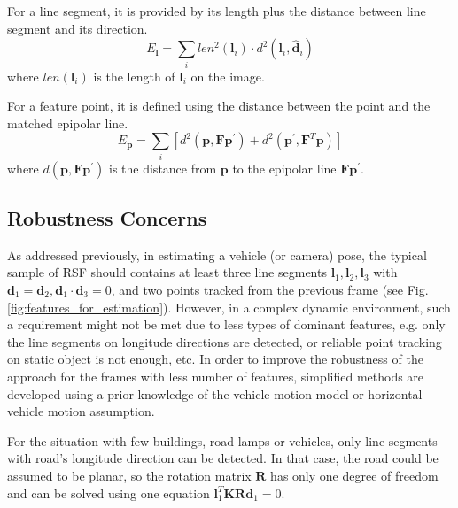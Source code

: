 \documentclass[letterpaper, 10 pt, conference]{ieeeconf}  %
\begin{document}
For a line segment, it is provided by its length plus the distance between line segment and its direction.
\begin{equation}
E_\mathbf{l} = \sum_{i} len^2(\mathbf{l}_i) \cdot d^2(\mathbf{l}_i,\hat{\mathbf{d}}_i)
\end{equation}
where $len(\mathbf{l}_i)$ is the length of $\mathbf{l}_i$ on the image.

For a feature point, it is defined using the distance between the point and the matched epipolar line.
\begin{equation}
E_\mathbf{p} = \sum_{i} \left[ d^2 (\mathbf{p}, \mathbf{F} \mathbf{p}^\prime)
+ d^2 (\mathbf{p}^\prime, \mathbf{F}^T\mathbf{p})\right]
\end{equation}
where $d (\mathbf{p}, \mathbf{F} \mathbf{p}^\prime)$ is the distance from $\mathbf{p}$ to the epipolar line $\mathbf{F} \mathbf{p}^\prime$.

\subsection{Robustness Concerns}
As addressed previously, in estimating a vehicle (or camera) pose, the typical sample of RSF should contains at least three line segments $\mathbf{l}_1,\mathbf{l}_2,\mathbf{l}_3$ with $\mathbf{d}_1=\mathbf{d}_2,\mathbf{d}_1\cdot \mathbf{d}_3=0$, and two points tracked from the previous frame (see Fig. \ref{fig:features_for_estimation}).
However, in a complex dynamic environment, such a requirement might not be met due to less types of dominant features, e.g. only the line segments on longitude directions are detected, or reliable point tracking on static object is not enough, etc. In order to improve the robustness of the approach for the frames with less number of features, simplified methods are developed using a prior knowledge of the vehicle motion model or horizontal vehicle motion assumption.

For the situation with few buildings, road lamps or vehicles, only line segments with road's longitude direction can be detected. In that case, the road could be assumed to be planar, so the rotation matrix $\mathbf{R}$ has only one degree of freedom and can be solved using one equation $\mathbf{l}_1^T\mathbf{K}\mathbf{R}\mathbf{d}_1=0$.
\end{document}
